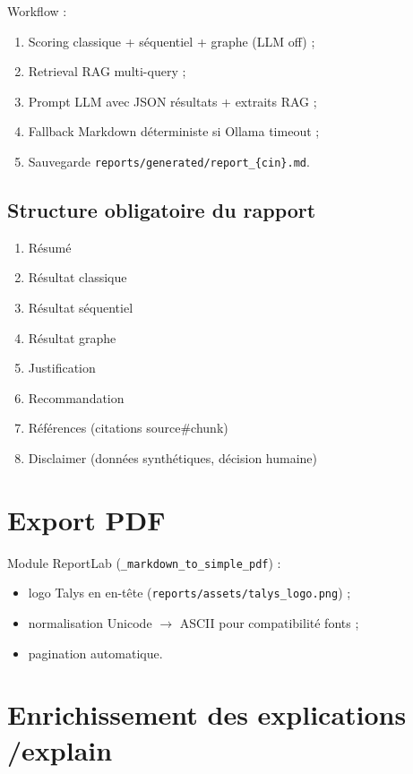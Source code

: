 Workflow :
\begin{enumerate}[leftmargin=*]
  \item Scoring classique + séquentiel + graphe (LLM off) ;
  \item Retrieval RAG multi-query ;
  \item Prompt LLM avec JSON résultats + extraits RAG ;
  \item Fallback Markdown déterministe si Ollama timeout ;
  \item Sauvegarde \texttt{reports/generated/report\_\{cin\}.md}.
\end{enumerate}

\subsection{Structure obligatoire du rapport}

\begin{enumerate}[leftmargin=*]
  \item Résumé
  \item Résultat classique
  \item Résultat séquentiel
  \item Résultat graphe
  \item Justification
  \item Recommandation
  \item Références (citations source\#chunk)
  \item Disclaimer (données synthétiques, décision humaine)
\end{enumerate}

\section{Export PDF}

Module ReportLab (\texttt{\_markdown\_to\_simple\_pdf}) :
\begin{itemize}[leftmargin=*]
  \item logo Talys en en-tête (\texttt{reports/assets/talys\_logo.png}) ;
  \item normalisation Unicode $\rightarrow$ ASCII pour compatibilité fonts ;
  \item pagination automatique.
\end{itemize}

\section{Enrichissement des explications /explain}

